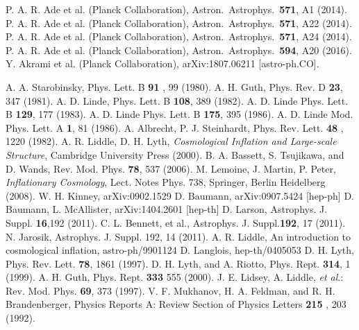 \documentclass[12pt]{revtex4}
\begin{document}
\begin{thebibliography}{99}

    P. A. R. Ade et al. (Planck Collaboration),
  Astron.\ Astrophys.\  {\bf 571}, A1 (2014).
 P. A. R. Ade et al. (Planck Collaboration),  Astron.\ Astrophys.\  {\bf 571}, A22 (2014).
 P. A. R. Ade et al. (Planck Collaboration), Astron.\ Astrophys.\  {\bf 571}, A24 (2014).
 P. A. R. Ade et al. (Planck Collaboration), Astron.\ Astrophys.\  {\bf 594}, A20 (2016).
 {Y. Akrami et al. (Planck Collaboration), 	arXiv:1807.06211 [astro-ph.CO].}

 A. A. Starobinsky, Phys. Lett. B \textbf{91} , 99 (1980).
 A. H. Guth, Phys. Rev. D \textbf{ 23}, 347 (1981).
 A. D. Linde, Phys. Lett. B  \textbf{108}, 389 (1982).
 A. D. Linde Phys. Lett. B  \textbf{129}, 177 (1983).
 A. D. Linde Phys. Lett. B \textbf{175}, 395 (1986).
A. D. Linde Mod. Phys. Lett. A \textbf{1}, 81 (1986).
A. Albrecht,   P. J. Steinhardt, Phys. Rev. Lett. \textbf{48 }, 1220 (1982).
  A. R. Liddle,  D. H. Lyth, \emph{Cosmological Inflation and Large-scale Structure}, Cambridge University Press (2000).
 B. A. Bassett, S. Tsujikawa, and  D. Wands, Rev. Mod. Phys. \textbf{78}, 537 (2006).
  M. Lemoine, J. Martin, P. Peter,  \emph{Inflationary Cosmology}, Lect. Notes Phys. 738, Springer, Berlin Heidelberg (2008).
W. H. Kinney, arXiv:0902.1529
D. Baumann, arXiv:0907.5424 [hep-ph]
D. Baumann,  L.  McAllister, arXiv:1404.2601 [hep-th]
D. Larson, Astrophys. J. Suppl. \textbf{16},192  (2011).
  C. L. Bennett, et al., Astrophys. J. Suppl.\textbf{192}, 17  (2011).
 N. Jarosik, Astrophys. J. Suppl. 192, 14 (2011).
  A. R. Liddle, An introduction to cosmological inflation, astro-ph/9901124
 D. Langlois, hep-th/0405053
D. H. Lyth, Phys. Rev. Lett. \textbf{78}, 1861 (1997).
D. H. Lyth,  and  A. Riotto, Phys. Rept. \textbf{314}, 1  (1999).
  A. H. Guth, Phys. Rept. \textbf{333} 555 (2000).
 J. E. Lidsey,  A. Liddle, \emph{et al}.: Rev. Mod. Phys. {\bf 69},  373 (1997).
  V. F. Mukhanov,  H. A. Feldman, and  R. H. Brandenberger, Physics Reports A: Review Section of Physics Letters \textbf{215} , 203 (1992).

\end{thebibliography}
\end{document}
